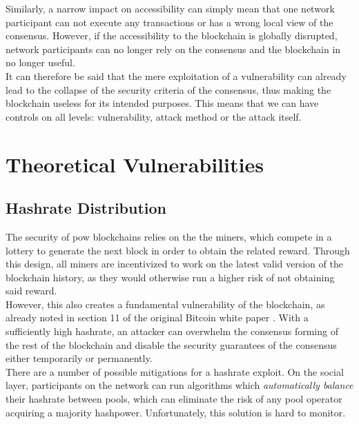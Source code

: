 \documentclass[12pt,a4paper]{article}
\begin{document}
Similarly, a narrow impact on accessibility can simply mean that one network participant can not execute any transactions or has a wrong local view of the \gls{consensus}. However, if the accessibility to the \gls{blockchain} is globally disrupted, network participants can no longer rely on the \gls{consensus} and the \gls{blockchain} in no longer useful.\\

It can therefore be said that the mere exploitation of a vulnerability can already lead to the collapse of the security criteria of the \gls{consensus}, thus making the \gls{blockchain} useless for its intended purposes. This means that we can have controls on all levels: vulnerability, attack method or the attack itself.\\

\section{Theoretical Vulnerabilities}

\subsection{Hashrate Distribution}

The security of \acrshort{pow} blockchains relies on the the miners, which compete in a lottery to generate the next block in order to obtain the related \gls{reward}. Through this design, all miners are incentivized to work on the latest valid version of the blockchain history, as they would otherwise run a higher risk of not obtaining said \gls{reward}.\\

However, this also creates a fundamental vulnerability of the \gls{blockchain}, as already noted in section 11 of the original Bitcoin white paper \cite{bitcoin}. With a sufficiently high \gls{hashrate}, an attacker can overwhelm the consensus forming of the rest of the \gls{blockchain} and disable the security guarantees of the \gls{consensus} either temporarily or permanently.\\

There are a number of possible mitigations for a hashrate exploit. On the social layer, participants on the network can run algorithms which \textit{automatically balance} their \gls{hashrate} between \glspl{pool}, which can eliminate the risk of any pool operator acquiring a majority hashpower. Unfortunately, this solution is hard to monitor.\\
\end{document}
